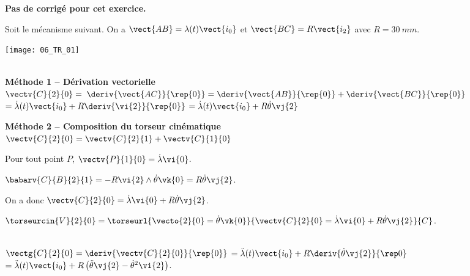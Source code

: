 \normaltrue
\correctiontrue


\setcounter{numques}{0}
\ifcorrection
\else
\textbf{Pas de corrigé pour cet exercice.}
\fi

\ifprof
\else
Soit le mécanisme suivant. On a $\vect{AB}=\lambda(t)\vect{i_0}$ et $\vect{BC}=R\vect{i_2}$ avec $R=\SI{30}{mm}$. 
\begin{center}
\texttt{[image: 06\_TR\_01]}
\end{center}
\fi

\ifprof ~\\

\textbf{Méthode 1 -- Dérivation vectorielle} ~\\

$\vectv{C}{2}{0} =$
$\deriv{\vect{AC}}{\rep{0}}= \deriv{\vect{AB}}{\rep{0}}+\deriv{\vect{BC}}{\rep{0}}$
$= \dot{\lambda}(t) \vect{i_0} + R \deriv{\vi{2}}{\rep{0}}$
$= \dot{\lambda}(t) \vect{i_0} + R \dot{\theta} \vj{2}$

\textbf{Méthode 2 -- Composition du torseur cinématique} ~\\
$\vectv{C}{2}{0} =\vectv{C}{2}{1} +\vectv{C}{1}{0} $

Pour tout point $P$, $\vectv{P}{1}{0}=\dot{\lambda}\vi{0}$.

$\babarv{C}{B}{2}{1}=-R\vi{2}\wedge \dot{\theta}\vk{0}=R\dot{\theta}\vj{2}$.

On a donc $\vectv{C}{2}{0}=\dot{\lambda}\vi{0}+R\dot{\theta}\vj{2}$.

\else
\fi

\ifprof

$\torseurcin{V}{2}{0}=\torseurl{\vecto{2}{0}=\dot{\theta}\vk{0}}{\vectv{C}{2}{0}=\dot{\lambda}\vi{0}+R\dot{\theta}\vj{2}}{C}$.


\else
\fi

\ifprof ~\\

$\vectg{C}{2}{0} =\deriv{\vectv{C}{2}{0}}{\rep{0}}$
$= \ddot{\lambda}(t) \vect{i_0} + R \deriv{\dot{\theta} \vj{2}}{\rep0}$
$= \ddot{\lambda}(t) \vect{i_0} + R \left(\ddot{\theta} \vj{2} - \dot{\theta}^2 \vi{2}\right) $.
\else
\fi


